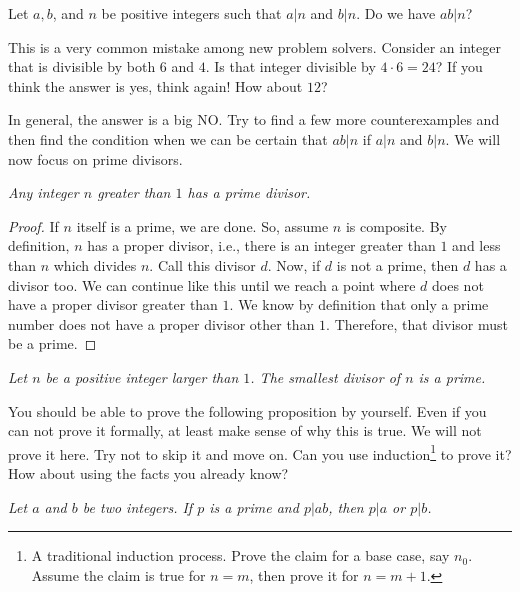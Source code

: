 \documentclass{subfile}
\begin{document}
	\begin{question}
		Let $a,b$, and $n$ be positive integers such that $a|n$ and $b|n$. Do we have $ab|n$?
	\end{question}
	This is a very common mistake among new problem solvers. Consider an integer that is divisible by both $6$ and $4$. Is that integer divisible by $4\cdot6=24$? If you think the answer is yes, think again! How about $12$?

	In general, the answer is a big NO. Try to find a few more counterexamples and then find the condition when we can be certain that $ab|n$ if $a|n$ and $b|n$. We will now focus on prime divisors.

	\begin{proposition}\slshape
		Any integer $n$ greater than $1$ has a prime divisor.
	\end{proposition}

	\begin{proof}
		If $n$ itself is a prime, we are done. So, assume $n$ is composite. By definition, $n$ has a proper divisor, i.e., there is an integer greater than $1$ and less than $n$ which divides $n$. Call this divisor $d$. Now, if $d$ is not a prime, then $d$ has a divisor too. We can continue like this until we reach a point where $d$ does not have a proper divisor greater than $1$. We know by definition that only a prime number does not have a proper divisor other than $1$. Therefore, that divisor must be a prime.
	\end{proof}

	\begin{corollary}\slshape\label{cor:smallestdivisor}
		Let $n$ be a positive integer larger than $1$. The smallest divisor of $n$ is a prime.
	\end{corollary}

	You should be able to prove the following proposition by yourself. Even if you can not prove it formally, at least make sense of why this is true. We will not prove it here. Try not to skip it and move on. Can you use induction\footnote{A traditional induction process. Prove the claim for a base case, say $n_0$. Assume the claim is true for $n=m$, then prove it for $n=m+1$.} to prove it? How about using the facts you already know?

	\begin{proposition}\slshape\label{prop:euclidslemma}
		Let $a$ and $b$ be two integers. If $p$ is a prime and $p|ab$, then $p|a$ or $p|b$.
	\end{proposition}
\end{document}
